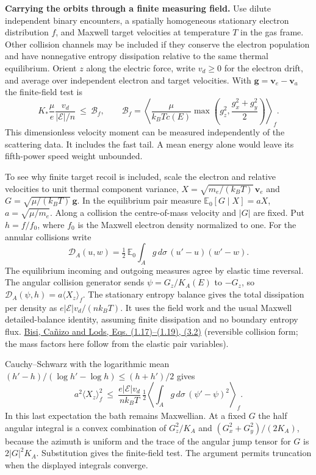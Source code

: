 \documentclass[11pt,a4paper]{article}
\begin{document}
\textbf{Carrying the orbits through a finite measuring field.} Use
dilute independent binary encounters, a spatially homogeneous stationary
electron distribution \(f\), and Maxwell target velocities at
temperature \(T\) in the gas frame. Other collision channels may be
included if they conserve the electron population and have nonnegative
entropy dissipation relative to the same thermal equilibrium. Orient
\(z\) along the electric force, write \(v_d\ge0\) for the electron
drift, and average over independent electron and target velocities. With
\(\mathbf g=\mathbf v_e-\mathbf v_a\) the finite-field test is \[
 K_*\frac{\mu}{e}\frac{v_d}{|\mathcal E|/n}
 \ \le\ \mathcal B_f,\qquad
 \mathcal B_f=\left\langle\frac{\mu}{k_BT c(E)}
 \max\!\left(g_z^2,\frac{g_x^2+g_y^2}{2}\right)\right\rangle_f .
\] This dimensionless velocity moment can be measured independently of
the scattering data. It includes the fast tail. A mean energy alone
would leave its fifth-power speed weight unbounded.

To see why finite target recoil is included, scale the electron and
relative velocities to unit thermal component variance,
\(X=\sqrt{m_e/(k_BT)}\,\mathbf v_e\) and
\(G=\sqrt{\mu/(k_BT)}\,\mathbf g\). In the equilibrium pair measure
\(\mathbb E_0[G\mid X]=aX\), \(a=\sqrt{\mu/m_e}\). Along a collision the
centre-of-mass velocity and \(|G|\) are fixed. Put \(h=f/f_0\), where
\(f_0\) is the Maxwell electron density normalized to one. For the
annular collisions write \[
 \mathcal D_A(u,w)=\tfrac12\,\mathbb E_0\int_A g\,d\sigma\,
                 (u'-u)(w'-w).
\] The equilibrium incoming and outgoing measures agree by elastic time
reversal. The angular collision generator sends \(\psi=G_z/K_A(E)\) to
\(-G_z\), so \(\mathcal D_A(\psi,h)=a\langle X_z\rangle_f\). The
stationary entropy balance gives the total dissipation per density as
\(e|\mathcal E|v_d/(n k_BT)\). It uses the field work and the usual
Maxwell detailed-balance identity, assuming finite dissipation and no
boundary entropy flux. \href{https://arxiv.org/pdf/1405.0366}{Bisi,
Cañizo and Lods, Eqs. (1.17)--(1.19), (3.2)} (reversible collision form;
the mass factors here follow from the elastic pair variables).

Cauchy--Schwarz with the logarithmic mean
\((h'-h)/(\log h'-\log h)\le(h+h')/2\) gives \[
 a^2\langle X_z\rangle_f^2\ \le\
 \frac{e|\mathcal E|v_d}{n k_BT}\,
 \tfrac12\left\langle\int_A g\,d\sigma\,(\psi'-\psi)^2\right\rangle_f .
\] In this last expectation the bath remains Maxwellian. At a fixed
\(G\) the half angular integral is a convex combination of \(G_z^2/K_A\)
and \((G_x^2+G_y^2)/(2K_A)\), because the azimuth is uniform and the
trace of the angular jump tensor for \(G\) is \(2|G|^2K_A\).
Substitution gives the finite-field test. The argument permits
truncation when the displayed integrals converge.
\end{document}
